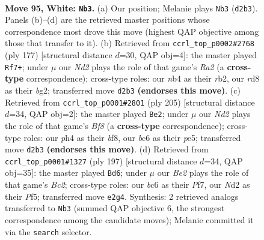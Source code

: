 \documentclass[11pt]{article}
\begin{document}
\clearpage

\begin{figure}[p]\centering
\begin{subfigure}{0.46\textwidth}\centering
\resizebox{\linewidth}{!}{%
\newchessgame
\chessboard[
  setfen={3r4/4kp2/2b3p1/4P3/1n3Ppp/8/3NBK1P/8 w - - 4 95},
  showmover=false,
  pgfstyle=straightmove, color=movearrow, markmove={d2-b3}
]}
\caption{}
\end{subfigure}\hfill
\begin{subfigure}{0.46\textwidth}\centering
\resizebox{\linewidth}{!}{%
\newchessgame
\chessboard[
  setfen={8/r7/3p4/3Pp2p/4P2P/8/1Rbk1KB1/8 b - - 76 89},
  showmover=false,
  pgfstyle=straightmove, color=movearrow, markmove={a7-f7}
]}
\caption{}
\end{subfigure}
\\[4pt]
\begin{subfigure}{0.46\textwidth}\centering
\resizebox{\linewidth}{!}{%
\newchessgame
\chessboard[
  setfen={5B2/1p6/4k1p1/P3P2p/2pK3P/2P3P1/8/5b2 b - - 10 103},
  showmover=false,
  pgfstyle=straightmove, color=movearrow, markmove={f1-e2}
]}
\caption{}
\end{subfigure}\hfill
\begin{subfigure}{0.46\textwidth}\centering
\resizebox{\linewidth}{!}{%
\newchessgame
\chessboard[
  setfen={8/p1b2p2/5k1p/2p2p1P/P4P2/2PBK3/1P6/8 b - - 14 99},
  showmover=false,
  pgfstyle=straightmove, color=movearrow, markmove={c7-d6}
]}
\caption{}
\end{subfigure}
\caption{\textbf{Move 95, White: \texttt{Nb3}.} (a) Our position; Melanie plays \texttt{Nb3} (\texttt{d2b3}). Panels (b)--(d) are the retrieved master positions whose correspondence most drove this move (highest QAP objective among those that transfer to it). (b) Retrieved from \texttt{ccrl\_top\_p0002\#2768} (ply 177) [structural distance $d$=30, QAP obj=4]: the master played \texttt{Rf7+}; under $\mu$ our \emph{Nd2} plays the role of that game's \emph{Ra2} (a \textbf{cross-type} correspondence); cross-type roles: our \emph{n}b4 as their \emph{r}b2, our \emph{r}d8 as their \emph{b}g2; transferred move \texttt{d2b3} \textbf{(endorses this move)}. (c) Retrieved from \texttt{ccrl\_top\_p0001\#2801} (ply 205) [structural distance $d$=34, QAP obj=2]: the master played \texttt{Be2}; under $\mu$ our \emph{Nd2} plays the role of that game's \emph{Bf8} (a \textbf{cross-type} correspondence); cross-type roles: our \emph{p}h4 as their \emph{b}f8, our \emph{b}c6 as their \emph{p}e5; transferred move \texttt{d2b3} \textbf{(endorses this move)}. (d) Retrieved from \texttt{ccrl\_top\_p0001\#1327} (ply 197) [structural distance $d$=34, QAP obj=35]: the master played \texttt{Bd6}; under $\mu$ our \emph{Be2} plays the role of that game's \emph{Bc2}; cross-type roles: our \emph{b}c6 as their \emph{P}f7, our \emph{N}d2 as their \emph{P}f5; transferred move \texttt{e2g4}. Synthesis: 2 retrieved analogs transferred to \texttt{Nb3} (summed QAP objective 6, the strongest correspondence among the candidate moves); Melanie committed it via the \texttt{search} selector.}
\label{fig:thought-m188}
\end{figure}
\end{document}

